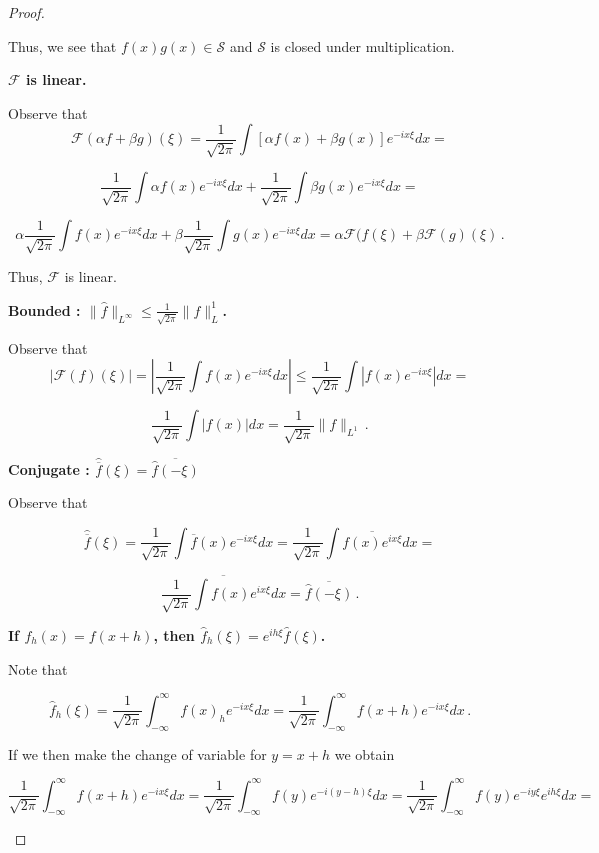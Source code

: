 \documentclass[a4paper]{article}
\newcommand{\br} [1] {\overline{#1}}
\numberwithin{equation}{section}
\begin{document}
\begin{description}
\begin{proof}
\begin{description}
Thus, we see that $f(x)g(x) \in \mathcal{S}$ and $\mathcal{S}$ is closed under multiplication.
	
	\item \textbf{$\mathcal{F}$ is linear.}
	
		Observe that 
		$$\mathcal{F}(\alpha f + \beta g)(\xi) = \frac{1}{\sqrt{2\pi}}\int [\alpha f(x) + \beta g(x)]e^{-ix\xi}dx =$$
		
		$$ \frac{1}{\sqrt{2\pi}}\int \alpha f(x) e^{-ix\xi}dx + \frac{1}{\sqrt{2\pi}}\int \beta g(x)e^{-ix\xi}dx = $$
		
		$$\alpha \frac{1}{\sqrt{2\pi}}\int f(x) e^{-ix\xi}dx + \beta\frac{1}{\sqrt{2\pi}}\int g(x)e^{-ix\xi}dx = \alpha\mathcal{F}( f(\xi)+\beta\mathcal{F}( g)(\xi)\,.$$
		
		Thus, $\mathcal{F}$ is linear.
		
	\item \textbf{Bounded : $\|\hat{f}\|_{L^\infty} \leq \frac{1}{\sqrt{2\pi}}\|f\|_L^1$.}
	
	Observe that 
	$$|\mathcal{F}(f)(\xi)| = |\frac{1}{\sqrt{2\pi}}\int f(x)e^{-ix\xi}dx| \leq \frac{1}{\sqrt{2\pi}}\int |f(x)e^{-ix\xi}|dx =$$
	
	$$ \frac{1}{\sqrt{2\pi}}\int |f(x)|dx = \frac{1}{\sqrt{2\pi}}\|f\|_{L^1}\,.$$
	
	\item \textbf{Conjugate : $\hat{\br{f}}(\xi) = \overline{\hat{f}(-\xi)}$}
	
	Observe that 
	
	$$\hat{\br{f}}(\xi) = \frac{1}{\sqrt{2\pi}}\int \br{f}(x)e^{-ix\xi}dx = \frac{1}{\sqrt{2\pi}}\int \br{f(x)e^{ix\xi}}dx = $$
	
	$$\br{\frac{1}{\sqrt{2\pi}}\int f(x)e^{ix\xi}dx} = \overline{\hat{f}(-\xi)}\,.$$	
	
	\item \textbf{If $f_h(x) = f(x+h)$, then
	 $\hat{f}_h(\xi) = e^{ih\xi}\hat{f}(\xi)$.}	

	Note that
	
		$$\hat{f}_h(\xi) = \frac{1}{\sqrt{2\pi}}\int_{-\infty}^\infty f(x)_he^{-ix\xi}dx = \frac{1}{\sqrt{2\pi}}\int_{-\infty}^\infty f(x+h)e^{-ix\xi}dx\,.$$
		
		If we then make the change of variable for $y = x+h$ we obtain
		
$$\frac{1}{\sqrt{2\pi}}\int_{-\infty}^\infty f(x+h)e^{-ix\xi}dx = \frac{1}{\sqrt{2\pi}}\int_{-\infty}^\infty f(y)e^{-i(y-h)\xi}dx = \frac{1}{\sqrt{2\pi}}\int_{-\infty}^\infty f(y)e^{-iy\xi}e^{ih\xi}dx = $$


\end{description}
\end{proof}
\end{description}
\end{document}
